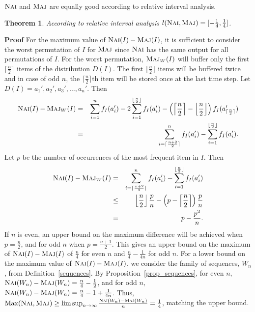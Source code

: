 \documentclass[11pt]{article}
\newtheorem{xtheorem}{Theorem}
\newenvironment{theorem}{\begin{xtheorem}\rm}{\end{xtheorem}}
\newenvironment{proof}{\begin{trivlist}\item[]{\bf Proof }}{\hspace*{\fill}\raisebox{-1pt}{\boldmath$\Box$}\end{trivlist}}
\newcommand{\maj}{{\ensuremath{\textsc{Maj}}}\xspace}
\newcommand{\nav}{{\ensuremath{\textsc{Nai}}}\xspace}
\DeclareMathOperator{\Max}{\textrm{Max}}
\begin{document}
\nav and \maj are equally good according to relative interval analysis.
\begin{theorem}\label{thm:relint_nav_maj}
 According to relative interval analysis $l(\nav, \maj) = [-\frac{1}{4}, \frac{1}{4}]$.
\end{theorem}
\begin{proof}
For the maximum value of $\nav (I) - \maj (I)$, it is sufficient to consider the worst permutation of $I$ for \maj since \nav has the same output for all permutations of $I$.
For the worst permutation, $\maj_W(I)$ will buffer only the first $\lceil \frac{n}{2} \rceil$ items of the distribution $D(I)$.
The first $\lfloor \frac{n}{2} \rfloor$ items will be buffered twice and in case of odd $n$, the $\lceil \frac{n}{2} \rceil$th item will be stored once at the last time step.
Let $D(I) = a_1', a_2', a_3',\ldots, a_n'$. Then
\begin{eqnarray}\nav(I) - \maj_W(I)  &=& \sum_{i=1}^n f_I(a'_i) - 2\sum_{i=1}^{\lfloor \frac{n}{2} \rfloor}f_I(a'_i) - \left (\left\lceil \frac{n}{2} \right\rceil - \left\lfloor \frac{n}{2} \right\rfloor \right) f_I(a'_{\lceil \frac{n}{2} \rceil}) \nonumber\\
 &=& \sum_{i=\lceil \frac{n+2}{2}\rceil}^n f_I(a'_i) - \sum_{i=1}^{\lfloor\frac{n}{2}\rfloor}f_I(a'_i). \label{eq:dif_navmaj}
\end{eqnarray}
Let $p$ be the number of occurrences of the most frequent item in $I$.  Then
\begin{eqnarray}
\nav(I) - \maj_W(I) &=&
\sum_{i=\lceil \frac{n+2}{2}\rceil}^n f_I(a'_i) - \sum_{i=1}^{\lfloor\frac{n}{2}\rfloor}f_I(a'_i) \nonumber
\\
&\leq& \left\lfloor\frac{n}{2}\right\rfloor\frac{p}{n} - \left(p - \left\lceil\frac{n}{2}\right\rceil\right)\frac{p}{n} \nonumber
\\
&=& p - \frac{p^2}{n}. \nonumber
\end{eqnarray}
If $n$ is even, an upper bound on the maximum difference will be achieved when $p = \frac{n}{2}$, and for odd $n$ when $p = \frac{n+1}{2}$.
This gives an upper bound on the maximum of $\nav(I) - \maj(I)$ of $\frac{n}{4}$ for even $n$ and $\frac{n}{4} - \frac{1}{4n}$ for odd $n$.
For a lower bound on the maximum value of $\nav (I) - \maj (I)$, we consider the family
of sequences, $W_n$, from Definition~\ref{sequences}. By Proposition~\ref{prop_sequences},
for even $n$,  $\nav (W_n) - \maj (W_n) = \frac{n}{4} - \frac{1}{2}$, and for odd $n$, $\nav (W_n) - \maj (W_n) = \frac{n}{4} - 1 + \frac{1}{4n}$.
Thus,
$\Max(\nav, \maj) \geq \limsup _{n\to \infty} \frac{\nav (W_n) - \maj (W_n)}{n} = \frac{1}{4}$,
matching the upper bound.



\end{proof}
\end{document}
